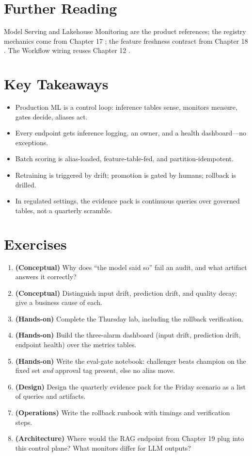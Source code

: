 \section{Further Reading}
Model Serving \cite{databricksModelServing} and Lakehouse Monitoring \cite{databricksLakehouseMonitoring} are the product references; the registry mechanics come from Chapter 17 \cite{databricksMLflow,mlflowDocs}; the feature freshness contract from Chapter 18 \cite{databricksFeatureStore}. The Workflow wiring reuses Chapter 12 \cite{databricksWorkflows}.

\section*{Key Takeaways}
\begin{itemize}
    \item Production ML is a control loop: inference tables sense, monitors measure, gates decide, aliases act.
    \item Every endpoint gets inference logging, an owner, and a health dashboard---no exceptions.
    \item Batch scoring is alias-loaded, feature-table-fed, and partition-idempotent.
    \item Retraining is triggered by drift; promotion is gated by humans; rollback is drilled.
    \item In regulated settings, the evidence pack is continuous queries over governed tables, not a quarterly scramble.
\end{itemize}

\section{Exercises}
\begin{enumerate}
    \item \textbf{(Conceptual)} Why does ``the model said so'' fail an audit, and what artifact answers it correctly?
    \item \textbf{(Conceptual)} Distinguish input drift, prediction drift, and quality decay; give a business cause of each.
    \item \textbf{(Hands-on)} Complete the Thursday lab, including the rollback verification.
    \item \textbf{(Hands-on)} Build the three-alarm dashboard (input drift, prediction drift, endpoint health) over the metrics tables.
    \item \textbf{(Hands-on)} Write the eval-gate notebook: challenger beats champion on the fixed set \emph{and} approval tag present, else no alias move.
    \item \textbf{(Design)} Design the quarterly evidence pack for the Friday scenario as a list of queries and artifacts.
    \item \textbf{(Operations)} Write the rollback runbook with timings and verification steps.
    \item \textbf{(Architecture)} Where would the RAG endpoint from Chapter 19 plug into this control plane? What monitors differ for LLM outputs?
\end{enumerate}

